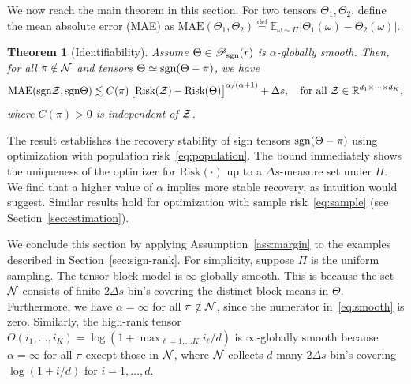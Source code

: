 \documentclass{article}
\theoremstyle{plain}
\newtheorem{thm}{Theorem}
\theoremstyle{definition}
\def\sign{\textup{sgn}}
\def\caliP{\mathscr{P}_{\textup{sgn}}}
\begin{document}

We now reach the main theorem in this section. For two tensors $\Theta_1,\Theta_2$, define the mean absolute error (MAE) as
$\text{MAE}(\Theta_1, \Theta_2)\stackrel{\text{def}}{=}\mathbb{E}_{\omega\sim \Pi}|\Theta_1(\omega)-\Theta_2(\omega)|.$


\begin{thm}[Identifiability]\label{thm:population}Assume $\Theta\in\caliP(r)$ is $\alpha$-globally smooth. Then, for all $\pi\notin\mathcal{N}$ and tensors $\bar \Theta \simeq \sign(\Theta-\pi)$, we have
\[
\textup{MAE}(\sign \tZ, \sign \bar \Theta) \lesssim C(\pi)\left[\textup{Risk}(\tZ)-\textup{Risk}( \bar \Theta)\right]^{\alpha/(\alpha+1)}+\Delta s, \quad \text{for all }\tZ\in\mathbb{R}^{d_1\times \cdots \times d_K},
\]
where $C(\pi)>0$ is independent of $\mathcal{Z}$. 
\end{thm}
The result establishes the recovery stability of sign tensors $\sign (\Theta-\pi)$ using optimization with population risk~\eqref{eq:population}. The bound immediately shows the uniqueness of the optimizer for $\text{Risk}(\cdot)$ up to a  $\Delta s$-measure set under $\Pi$. We find that a higher value of $\alpha$ implies more stable recovery, as intuition would suggest. Similar results hold for optimization with sample risk~\eqref{eq:sample} (see Section~\ref{sec:estimation}). 

We conclude this section by applying Assumption~\ref{ass:margin} to the examples described in Section~\ref{sec:sign-rank}. For simplicity, suppose $\Pi$ is the uniform sampling. 
The tensor block model is $\infty$-globally smooth. This is because the set $\mathcal{N}$ consists of finite $2\Delta s$-bin's covering the distinct block means in $\Theta$. Furthermore, we have $\alpha= \infty$ for all $\pi \notin \mathcal{N}$, since the numerator in~\eqref{eq:smooth} is zero. Similarly, the high-rank tensor $\Theta(i_1,\ldots,i_K) = \log(1+\max_{\ell = 1,\ldots K}i_\ell/d)$ is $\infty$-globally smooth because $\alpha=\infty$ for all $\pi$ except those in $\mathcal{N}$, where $\mathcal{N}$ collects $d$ many $2\Delta s$-bin's covering $\log(1+i/d)$ for $i =1,\ldots, d$.
\end{document}
